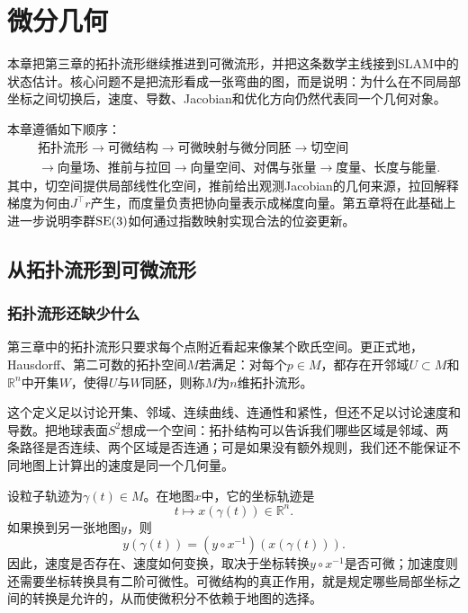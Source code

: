 \chapter{微分几何}

\newenvironment{slamcase}[1]{%
    \par\noindent\textbf{\color{main}例：#1}\rmfamily\par
}{%
    \par\ignorespacesafterend
}

本章把第三章的拓扑流形继续推进到可微流形，并把这条数学主线接到SLAM中的状态估计。核心问题不是把流形看成一张弯曲的图，而是说明：为什么在不同局部坐标之间切换后，速度、导数、Jacobian和优化方向仍然代表同一个几何对象。

本章遵循如下顺序：
\[
\begin{aligned}
&\text{拓扑流形}
\longrightarrow \text{可微结构}
\longrightarrow \text{可微映射与微分同胚}
\longrightarrow \text{切空间} \\
&\longrightarrow \text{向量场、推前与拉回}
\longrightarrow \text{向量空间、对偶与张量}
\longrightarrow \text{度量、长度与能量}.
\end{aligned}
\]
其中，切空间提供局部线性化空间，推前给出观测Jacobian的几何来源，拉回解释梯度为何由$J^\top r$产生，而度量负责把协向量表示成梯度向量。第五章将在此基础上进一步说明李群$\operatorname{SE}(3)$如何通过指数映射实现合法的位姿更新。


\section{从拓扑流形到可微流形}

\subsection{拓扑流形还缺少什么}

第三章中的拓扑流形只要求每个点附近看起来像某个欧氏空间。更正式地，Hausdorff、第二可数的拓扑空间$M$若满足：对每个$p\in M$，都存在开邻域$U\subset M$和$\mathbb R^n$中开集$W$，使得$U$与$W$同胚，则称$M$为$n$维拓扑流形。

这个定义足以讨论开集、邻域、连续曲线、连通性和紧性，但还不足以讨论速度和导数。把地球表面$S^2$想成一个空间：拓扑结构可以告诉我们哪些区域是邻域、两条路径是否连续、两个区域是否连通；可是如果没有额外规则，我们还不能保证不同地图上计算出的速度是同一个几何量。

设粒子轨迹为$\gamma(t)\in M$。在地图$x$中，它的坐标轨迹是
\[
    t\longmapsto x(\gamma(t))\in\mathbb R^n.
\]
如果换到另一张地图$y$，则
\[
    y(\gamma(t))
    =(y\circ x^{-1})(x(\gamma(t))).
\]
因此，速度是否存在、速度如何变换，取决于坐标转换$y\circ x^{-1}$是否可微；加速度则还需要坐标转换具有二阶可微性。可微结构的真正作用，就是规定哪些局部坐标之间的转换是允许的，从而使微积分不依赖于地图的选择。

